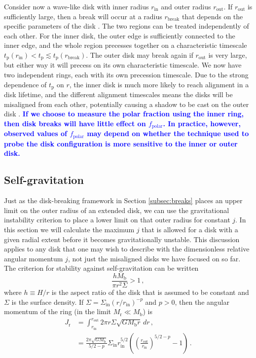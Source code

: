\documentclass[twocolumn,linenumbers]{aastex631}
\newcommand{\RR}[1]{\textcolor{blue}{\bf#1}} %
\begin{document}
Consider now a wave-like disk with inner radius $r_\text{in}$ and outer radius $r_\text{out}$. If $r_\text{out}$ is sufficiently large, then a break will occur at a radius $r_\text{break}$ that depends on the specific parameters of the disk \citep[see][eq. (9)]{rabago2024}. The two regions can be treated independently of each other. For the inner disk, the outer edge is sufficiently connected to the inner edge, and the whole region precesses together on a characteristic timescale $t_\text{p}(r_\text{in}) < t_\text{p} \lesssim t_\text{p}(r_\text{break})$. The outer disk may break again if $r_\text{out}$ is very large, but either way it will precess on its own characteristic timescale. We now have two independent rings, each with its own precession timescale. Due to the strong dependence of $t_\text{p}$ on $r$, the inner disk is much more likely to reach alignment in a disk lifetime, and the different alignment timescales means the disks will be misaligned from each other, potentially causing a shadow to be cast on the outer disk \RR{\citep[see][]{bohn2022,benisty2023,su2024,zhang2024,zhu2024}}. \RR{If we choose to measure the polar fraction using the inner ring, then disk breaks will have little effect on $f_\text{polar}$. In practice, however, observed values of $f_\text{polar}$ may depend on whether the technique used to probe the disk configuration is more sensitive to the inner or outer disk.}

\subsection{Self-gravitation}
\label{subsec:toomre}
Just as the disk-breaking framework in Section \ref{subsec:breaks} places an upper limit on the outer radius of an extended disk, we can use the gravitational instability criterion to place a lower limit on that outer radius for constant $j$. In this section we will calculate the maximum $j$ that is allowed for a disk with a given radial extent before it becomes gravitationally unstable. This discussion applies to any disk that one may wish to describe with the dimensionless relative angular momentum $j$, not just the misaligned disks we have focused on so far. The criterion for stability against self-gravitation \citep{toomre1964} can be written
\begin{equation}
    \label{eq:toomre}
    \frac{hM_\text{b}}{\pi r^2 \Sigma} > 1\, ,
\end{equation}
where $h\equiv H/r$ is the aspect ratio of the disk that is assumed to be constant and $\Sigma$ is the surface density. If $\Sigma = \Sigma_\text{in} (r/r_\text{in})^{-p}$ and $p>0$, then the angular momentum of the ring (in the limit $M_\text{r} \ll M_\text{b}$) is
\begin{align}
    J_\text{r} &= \int_{r_\text{in}}^{r_\text{out}} 2\pi r \Sigma  \sqrt{GM_\text{b}r}\,dr \, , \nonumber \\
    & = \frac{2\pi\sqrt{GM_\text{b}}}{5/2 - p} \Sigma_\text{in} r_\text{in}^{5/2} \left( \left( \frac{r_\text{out}}{r_\text{in}} \right)^{5/2 - p}- 1\right)\, \label{eq:Jr}.
\end{align}
\end{document}
